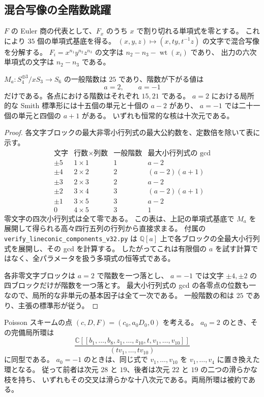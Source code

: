 \subsection{混合写像の全階数跳躍}

$F$ の Euler 商の代表として、$F_x$ のうち $x$ で割り切れる単項式を零とする。
これにより $35$ 個の単項式基底を得る。
$(x,y,z)\mapsto(x,ty,t^{-1}z)$ の文字で混合写像を分解する。
$F_i=x^{n_1}y^{n_2}z^{n_3}$ の文字は $n_2-n_3-\operatorname{wt}(x_i)$ であり、
出力の六次単項式の文字は $n_2-n_3$ である。

\begin{lemma}[直線・二次曲線型の混合行列]
\label{lem:lineconic-matrix-v32}
$M_a:S_4^{\oplus3}/xS_3\to S_6$ の一般階数は $25$ であり、階数が下がる値は
\[
 a=2,\qquad a=-1
\]
だけである。各点における階数はそれぞれ $15,21$ である。
$a=2$ における局所的な Smith 標準形には十五個の単元と十個の $a-2$ があり、
$a=-1$ では二十一個の単元と四個の $a+1$ がある。
いずれも恒常的な核は十次元である。
\end{lemma}

\begin{proof}
各文字ブロックの最大非零小行列式の最大公約数を、定数倍を除いて表に示す。
\[
\begin{array}{c|c|c|c}
\text{文字}&\text{行数}\times\text{列数}&\text{一般階数}&\text{最大小行列式の gcd}\\\hline
\pm5&1\times1&1&a-2\\
\pm4&2\times2&2&(a-2)(a+1)\\
\pm3&2\times3&2&a-2\\
\pm2&3\times4&3&(a-2)(a+1)\\
\pm1&3\times5&3&a-2\\
0&4\times5&3&1
\end{array}
\]
零文字の四次小行列式は全て零である。
この表は、上記の単項式基底で $M_a$ を展開して得られる高々四行五列の行列から直接求まる。
付属の \texttt{verify\_lineconic\_components\_v32.py} は
$\mathbb Q[a]$ 上で各ブロックの全最大小行列式を展開し、その gcd を計算する。
したがってこれは有限個の $a$ を試す計算ではなく、全パラメータを扱う多項式の恒等式である。

各非零文字ブロックは $a=2$ で階数を一つ落とし、
$a=-1$ では文字 $\pm4,\pm2$ の四ブロックだけが階数を一つ落とす。
最大小行列式の gcd の各零点の位数も一なので、局所的な非単元の基本因子は全て一次である。
一般階数の和は $25$ であり、主張の標準形が従う。
\end{proof}

\begin{theorem}[二つの共鳴点における完全な形式局所環]
\label{thm:lineconic-local-v32}
Poisson スキームの点 $(c,D,F)=(c_0,a_0D_0,0)$ を考える。
$a_0=2$ のとき、その完備局所環は
\[
 \frac{\mathbb C[[b_1,\ldots,b_8,z_1,\ldots,z_{10},t,v_1,\ldots,v_{10}]]}
 {(tv_1,\ldots,tv_{10})}
\]
に同型である。
$a_0=-1$ のときは、同じ式で $v_1,\ldots,v_{10}$ を $v_1,\ldots,v_4$ に置き換えた環となる。
従って前者は次元 $28$ と $19$、後者は次元 $22$ と $19$ の二つの滑らかな枝を持ち、
いずれもその交叉は滑らかな十八次元である。両局所環は被約である。
\end{theorem}

